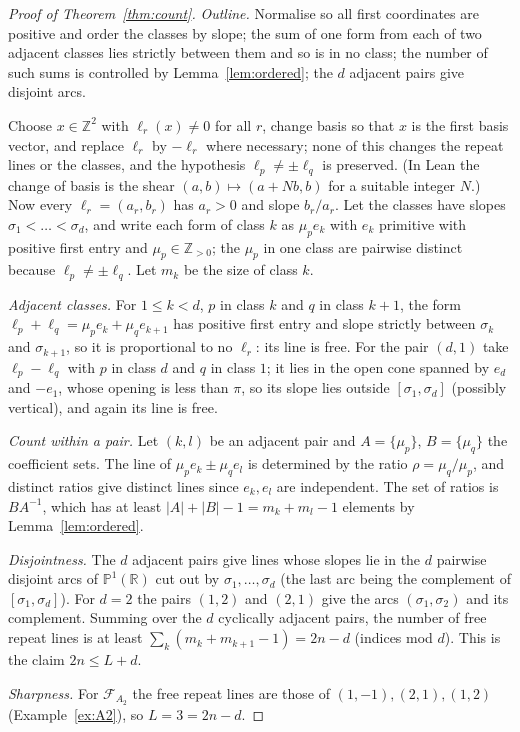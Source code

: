 \documentclass[11pt]{amsart}
\theoremstyle{definition}
\theoremstyle{remark}
\newcommand{\R}{\mathbb{R}}
\newcommand{\Z}{\mathbb{Z}}
\begin{document}
\begin{proof}[Proof of Theorem~\ref{thm:count}]
\emph{Outline.} Normalise so all first coordinates are positive and order the classes by slope; the sum of one form from each of two adjacent classes lies strictly between them and so is in no class; the number of such sums is controlled by Lemma~\ref{lem:ordered}; the $d$ adjacent pairs give disjoint arcs.

Choose $x\in\Z^2$ with $\ell_r(x)\ne0$ for all $r$, change basis so that $x$ is the first basis vector, and replace $\ell_r$ by $-\ell_r$ where necessary; none of this changes the repeat lines or the classes, and the hypothesis $\ell_p\ne\pm\ell_q$ is preserved. (In Lean the change of basis is the shear $(a,b)\mapsto(a+Nb,b)$ for a suitable integer $N$.) Now every $\ell_r=(a_r,b_r)$ has $a_r>0$ and slope $b_r/a_r$. Let the classes have slopes $\sigma_1<\dots<\sigma_d$, and write each form of class $k$ as $\mu_pe_k$ with $e_k$ primitive with positive first entry and $\mu_p\in\Z_{>0}$; the $\mu_p$ in one class are pairwise distinct because $\ell_p\ne\pm\ell_q$. Let $m_k$ be the size of class $k$.

\emph{Adjacent classes.} For $1\le k<d$, $p$ in class $k$ and $q$ in class $k+1$, the form $\ell_p+\ell_q=\mu_pe_k+\mu_qe_{k+1}$ has positive first entry and slope strictly between $\sigma_k$ and $\sigma_{k+1}$, so it is proportional to no $\ell_r$: its line is free. For the pair $(d,1)$ take $\ell_p-\ell_q$ with $p$ in class $d$ and $q$ in class $1$; it lies in the open cone spanned by $e_d$ and $-e_1$, whose opening is less than $\pi$, so its slope lies outside $[\sigma_1,\sigma_d]$ (possibly vertical), and again its line is free.

\emph{Count within a pair.} Let $(k,l)$ be an adjacent pair and $A=\{\mu_p\}$, $B=\{\mu_q\}$ the coefficient sets. The line of $\mu_pe_k\pm\mu_qe_l$ is determined by the ratio $\rho=\mu_q/\mu_p$, and distinct ratios give distinct lines since $e_k,e_l$ are independent. The set of ratios is $BA^{-1}$, which has at least $|A|+|B|-1=m_k+m_l-1$ elements by Lemma~\ref{lem:ordered}.

\emph{Disjointness.} The $d$ adjacent pairs give lines whose slopes lie in the $d$ pairwise disjoint arcs of $\mathbb P^1(\R)$ cut out by $\sigma_1,\dots,\sigma_d$ (the last arc being the complement of $[\sigma_1,\sigma_d]$). For $d=2$ the pairs $(1,2)$ and $(2,1)$ give the arcs $(\sigma_1,\sigma_2)$ and its complement. Summing over the $d$ cyclically adjacent pairs, the number of free repeat lines is at least $\sum_{k}(m_k+m_{k+1}-1)=2n-d$ (indices mod $d$). This is the claim $2n\le L+d$.

\emph{Sharpness.} For $\mathcal F_{A_2}$ the free repeat lines are those of $(1,-1),(2,1),(1,2)$ (Example~\ref{ex:A2}), so $L=3=2n-d$.
\end{proof}
\end{document}
